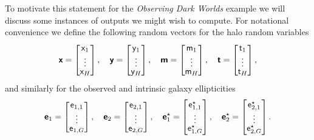 To motivate this statement for the \emph{Observing Dark Worlds} example we will discuss some instances of outputs we might wish to compute. For notational convenience we define the following random vectors for the halo random variables
\begin{equation}
  \boldsymbol{\mathsf{x}} = \begin{bmatrix} \mathsf{x}_1 \\ \vdots \\[-1mm] \mathsf{x}_H \end{bmatrix},
  \quad
  \boldsymbol{\mathsf{y}} = \begin{bmatrix} \mathsf{y}_1 \\ \vdots \\[-1mm] \mathsf{y}_H \end{bmatrix},
  \quad
  \boldsymbol{\mathsf{m}} = \begin{bmatrix} \mathsf{m}_1 \\ \vdots \\[-1mm] \mathsf{m}_H \end{bmatrix},
  \quad
  \boldsymbol{\mathsf{t}} = \begin{bmatrix} \mathsf{t}_1 \\ \vdots \\[-1mm] \mathsf{t}_H \end{bmatrix},
\end{equation}
and similarly for the observed and intrinsic galaxy ellipticities
\begin{equation}
  \boldsymbol{\mathsf{e}}_1 = \begin{bmatrix} 
    \mathsf{e}_{1,1} \\ \vdots \\[-1mm] \mathsf{e}_{1,G}
  \end{bmatrix},
  \quad
  \boldsymbol{\mathsf{e}}_2 = \begin{bmatrix} 
    \mathsf{e}_{2,1} \\ \vdots \\[-1mm] \mathsf{e}_{2,G}
  \end{bmatrix},
  \quad
  \boldsymbol{\mathsf{e}}^\star_1 = \begin{bmatrix} 
    \mathsf{e}^\star_{1,1} \\ \vdots \\[-1mm] \mathsf{e}^\star_{1,G}
  \end{bmatrix},
  \quad
  \boldsymbol{\mathsf{e}}^\star_2 = \begin{bmatrix} 
    \mathsf{e}^\star_{2,1} \\ \vdots \\[-1mm] \mathsf{e}^\star_{2,G}
  \end{bmatrix}.
\end{equation}
